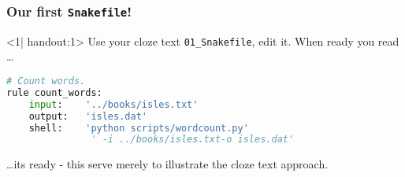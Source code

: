 \begin{frame}[fragile]
  \frametitle{Our first \texttt{Snakefile}!}
  \begin{onlyenv}<1| handout:1>
    Use your cloze text \texttt{01\_Snakefile}, edit it. When ready you read \ldots
    \begin{lstlisting}[language=Python,style=Python]
# Count words.
rule count_words:
    input:    '../books/isles.txt'
    output:   'isles.dat'
    shell:    'python scripts/wordcount.py' 
               ' -i ../books/isles.txt-o isles.dat'
    \end{lstlisting}
  \ldots its ready - this serve merely to illustrate the cloze text approach.\newline
  

\end{onlyenv}
\end{frame}
